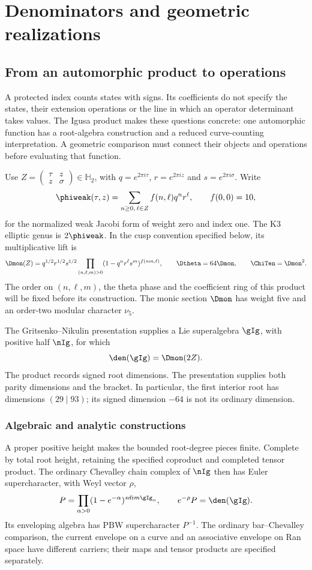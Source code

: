 \part{Denominators and geometric realizations}
\chapter{From an automorphic product to operations}
\label{comp:ch:entrance}

A protected index counts states with signs. Its coefficients do not
specify the states, their extension operations or the line in which an
operator determinant takes values. The Igusa product makes these
questions concrete: one automorphic function has a root-algebra
construction and a reduced curve-counting interpretation. A geometric
comparison must connect their objects and operations before evaluating
that function.

Use $Z=\left(\begin{smallmatrix}\tau&z\\z&\sigma\end{smallmatrix}\right)\in\mathbb H_2$,
with $q=e^{2\pi i\tau}$, $r=e^{2\pi iz}$ and $s=e^{2\pi i\sigma}$. Write
\[
 \phiweak(\tau,z)=\sum_{n\geq0,\,\ell\in\mathbb Z}
                     f(n,\ell)q^nr^\ell,
 \qquad f(0,0)=10,
\]
for the normalized weak Jacobi form of weight zero and index one.
The K3 elliptic genus is \(2\phiweak\). In the cusp convention
specified below, its multiplicative lift is
\[
 \Dmon(Z)=q^{1/2}r^{1/2}s^{1/2}
       \prod_{(n,\ell,m)>0}(1-q^nr^\ell s^m)^{f(nm,\ell)},
 \qquad \Dtheta=64\Dmon,\qquad \ChiTen=\Dmon^2.
\]
The order on \((n,\ell,m)\), the theta phase and the coefficient
ring of this product will be fixed before its construction.
The monic section \(\Dmon\) has weight five and an order-two
modular character $\nu_5$.

The Gritsenko--Nikulin presentation supplies a Lie superalgebra
\(\gIg\), with positive half \(\nIg\), for which
\[
 \den(\gIg)=\Dmon(2Z).
\]
The product records signed root dimensions. The presentation supplies
both parity dimensions and the bracket. In particular, the first
interior root has dimensions \((29\mid93)\); its signed dimension
\(-64\) is not its ordinary dimension.

\section{Algebraic and analytic constructions}

A proper positive height makes the bounded root-degree pieces finite.
Complete by total root height, retaining the specified coproduct and
completed tensor product. The ordinary Chevalley chain complex of
\(\nIg\) then has Euler supercharacter, with Weyl vector $\rho$,
\[
 P=\prod_{\alpha>0}(1-e^{-\alpha})^{\operatorname{sdim}\gIg_\alpha},
 \qquad e^{-\rho}P=\den(\gIg).
\]
Its enveloping algebra has PBW supercharacter \(P^{-1}\).
The ordinary bar--Chevalley comparison, the current envelope on a
curve and an associative envelope on Ran space have different
carriers; their maps and tensor products are specified separately.


